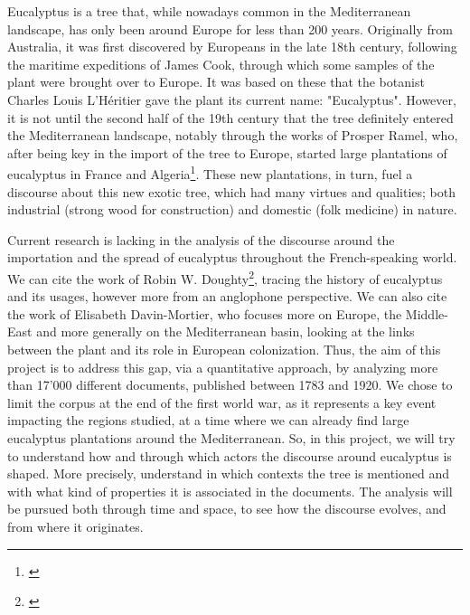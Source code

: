 

Eucalyptus is a tree that, while nowadays common in the Mediterranean landscape, has only been around Europe for less than 200 years. Originally from Australia, it was first discovered by Europeans in the late 18th century, following the maritime expeditions of James Cook, through which some samples of the plant were brought over to Europe. It was based on these that the botanist Charles Louis L'Héritier gave the plant its current name: "Eucalyptus". However, it is not until the second half of the 19th century that the tree definitely entered the Mediterranean landscape, notably through the works of Prosper Ramel, who, after being key in the import of the tree to Europe, started large plantations of eucalyptus in France and Algeria\footnote{\cite[2]{davin-mortier_leucalyptus_2026}}. These new plantations, in turn, fuel a discourse about this new exotic tree, which had many virtues and qualities; both industrial (strong wood for construction) and domestic (folk medicine) in nature.


Current research is lacking in the analysis of the discourse around the importation and the spread of eucalyptus throughout the French-speaking world. We can cite the work of Robin W. Doughty\footnote{\cite{doughty_eucalyptus_2000}}, tracing the history of eucalyptus and its usages, however more from an anglophone perspective. We can also cite the work of Elisabeth Davin-Mortier, who focuses more on Europe, the Middle-East and more generally on the Mediterranean basin, looking at the links between the plant and its role in European colonization. Thus, the aim of this project is to address this gap, via a quantitative approach, by analyzing more than 17'000 different documents, published between 1783 and 1920. We chose to limit the corpus at the end of the first world war, as it represents a key event impacting the regions studied, at a time where we can already find large eucalyptus plantations around the Mediterranean. So, in this project, we will try to understand how and through which actors the discourse around eucalyptus is shaped. More precisely, understand in which contexts the tree is mentioned and with what kind of properties it is associated in the documents. The analysis will be pursued both through time and space, to see how the discourse evolves, and from where it originates. 
